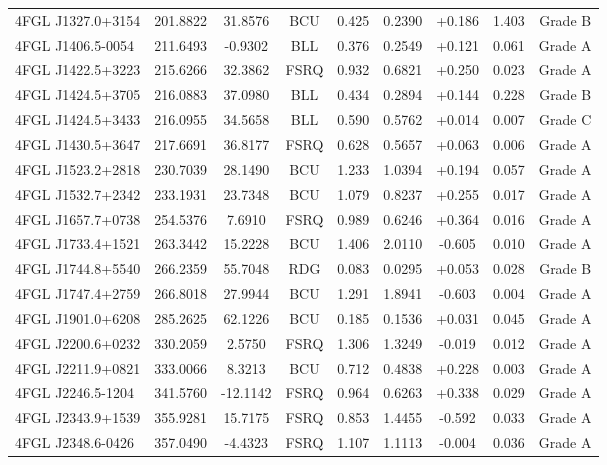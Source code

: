 \begin{table}[t]
\begin{tabular}{lcccccccc}
4FGL J1327.0+3154 & 201.8822 & 31.8576 & BCU & 0.425 & 0.2390 & +0.186 & 1.403 & Grade B \\
4FGL J1406.5-0054 & 211.6493 & -0.9302 & BLL & 0.376 & 0.2549 & +0.121 & 0.061 & Grade A \\
4FGL J1422.5+3223 & 215.6266 & 32.3862 & FSRQ & 0.932 & 0.6821 & +0.250 & 0.023 & Grade A \\
4FGL J1424.5+3705 & 216.0883 & 37.0980 & BLL & 0.434 & 0.2894 & +0.144 & 0.228 & Grade B \\
4FGL J1424.5+3433 & 216.0955 & 34.5658 & BLL & 0.590 & 0.5762 & +0.014 & 0.007 & Grade C \\
4FGL J1430.5+3647 & 217.6691 & 36.8177 & FSRQ & 0.628 & 0.5657 & +0.063 & 0.006 & Grade A \\
4FGL J1523.2+2818 & 230.7039 & 28.1490 & BCU & 1.233 & 1.0394 & +0.194 & 0.057 & Grade A \\
4FGL J1532.7+2342 & 233.1931 & 23.7348 & BCU & 1.079 & 0.8237 & +0.255 & 0.017 & Grade A \\
4FGL J1657.7+0738 & 254.5376 & 7.6910 & FSRQ & 0.989 & 0.6246 & +0.364 & 0.016 & Grade A \\
4FGL J1733.4+1521 & 263.3442 & 15.2228 & BCU & 1.406 & 2.0110 & -0.605 & 0.010 & Grade A \\
4FGL J1744.8+5540 & 266.2359 & 55.7048 & RDG & 0.083 & 0.0295 & +0.053 & 0.028 & Grade B \\
4FGL J1747.4+2759 & 266.8018 & 27.9944 & BCU & 1.291 & 1.8941 & -0.603 & 0.004 & Grade A \\
4FGL J1901.0+6208 & 285.2625 & 62.1226 & BCU & 0.185 & 0.1536 & +0.031 & 0.045 & Grade A \\
4FGL J2200.6+0232 & 330.2059 & 2.5750 & FSRQ & 1.306 & 1.3249 & -0.019 & 0.012 & Grade A \\
4FGL J2211.9+0821 & 333.0066 & 8.3213 & BCU & 0.712 & 0.4838 & +0.228 & 0.003 & Grade A \\
4FGL J2246.5-1204 & 341.5760 & -12.1142 & FSRQ & 0.964 & 0.6263 & +0.338 & 0.029 & Grade A \\
4FGL J2343.9+1539 & 355.9281 & 15.7175 & FSRQ & 0.853 & 1.4455 & -0.592 & 0.033 & Grade A \\
4FGL J2348.6-0426 & 357.0490 & -4.4323 & FSRQ & 1.107 & 1.1113 & -0.004 & 0.036 & Grade A \\
\hline
\end{tabular}
\end{table}
